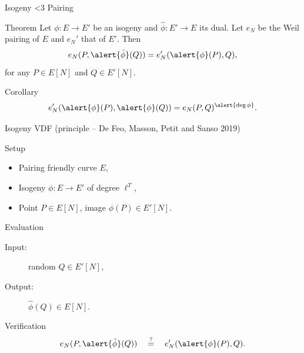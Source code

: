 \documentclass[aspectratio=169]{beamer}
\begin{document}

\begin{frame}{Isogeny <3 Pairing}
  \begin{block}{Theorem}
    Let \emph{$\phi:E\to E'$} be an isogeny and \emph{$\hat{\phi}:E' \to E$} its dual.
    Let \emph{$e_N$} be the Weil pairing of $E$ and \emph{$e_N'$} that
    of $E'$. %
    Then
    \[e_N(P,\alert{\hat{\phi}}(Q)) = e_N'(\alert{\phi}(P),Q),\]
    for any \emph{$P\in E[N]$} and \emph{$Q\in E'[N]$}.
  \end{block}
  
  \begin{block}{Corollary}
    \[e_N'(\alert{\phi}(P),\alert{\phi}(Q)) = e_N(P,Q)^{\alert{\deg\phi}}.\]
  \end{block}
\end{frame}


\begin{frame}{Isogeny VDF {\small (principle -- De Feo, Masson, Petit and Sanso 2019)}}
  \begin{block}{Setup}
    \begin{itemize}
    \item Pairing friendly curve \emph{$E$},
    \item Isogeny \emph{$\phi:E\to E'$} of degree \emph{$\ell^T$},
    \item Point \emph{$P\in E[N]$}, image \emph{$\phi(P) \in E'[N]$}.
    \end{itemize}
  \end{block}

  \begin{block}{Evaluation}
    \begin{description}
    \item[Input:] random \emph{$Q\in E'[N]$},
    \item[Output:] \emph{$\hat\phi(Q) \in E[N]$}.
    \end{description}
  \end{block}

  \begin{block}{Verification}
    \large
    \[e_N(P,\alert{\hat\phi}(Q)) \quad\overset{?}{=}\quad e_N'(\alert{\phi}(P),Q).\]
  \end{block}
\end{frame}

\end{document}
